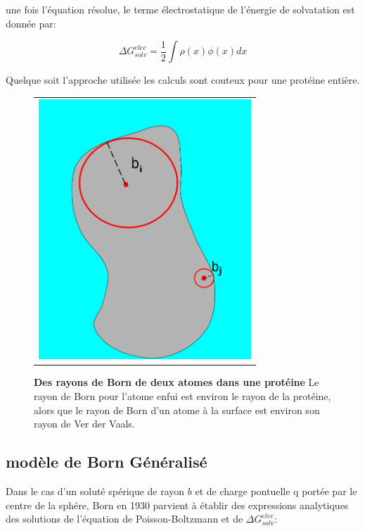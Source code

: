 une fois l'équation résolue, le terme électrostatique de l'énergie de solvatation est donnée par:

\begin{equation}
\Delta G_{solv}^{elec} = \frac{1}{2} \int \rho(x)\phi(x)dx  
\end{equation}

Quelque soit l'approche utilisée les calculs sont couteux pour une protéine entière.



   \begin{figure}[t]
     \centering
     \begin{tabular}{c}
       \includegraphics[width=8cm]{figure/rayon_Born.png} &
     \end{tabular}
     
     \caption{\textbf{Des rayons de Born de deux atomes dans une protéine} Le rayon de Born pour l'atome enfui est environ le rayon de la protéine, alors que le rayon de Born d'un atome à la surface est environ son rayon de Ver der Vaals.} 
\label{graph:surface}
   \end{figure}



\subsection{modèle de Born Généralisé}

Dans le cas d'un soluté spérique de rayon $b$ et de charge pontuelle q portée par le centre de la sphére, Born en 1930  parvient à établir des expressions analytiques des solutions de l'équation de Poisson-Boltzmann et de $ \Delta G_{solv}^{elec}$:


